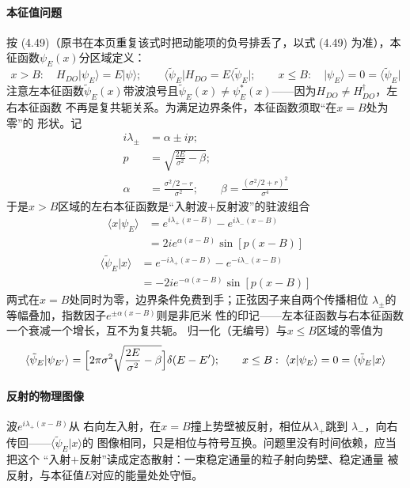 \paragraph{本征值问题}
按 (4.49)（原书在本页重复该式时把动能项的负号排丢了，以式 (4.49)
为准），本征函数$\psi_E(x)$分区域定义：
\begin{equation*}
x>B:\quad H_{DO}\vert\psi_E\rangle=E\vert\psi\rangle;\qquad
\langle\tilde{\psi}_E\vert H_{DO}=E\langle\tilde{\psi}_E\vert;
\qquad x\leq B:\quad \vert\psi_E\rangle=0=\langle\tilde{\psi}_E\vert
\end{equation*}
注意左本征函数$\tilde{\psi}_E(x)$带波浪号且$\tilde{\psi}_E(x)\neq
\psi_E^{*}(x)$——因为$H_{DO}\neq H_{DO}^{\dagger}$，左右本征函数
不再是复共轭关系。为满足边界条件，本征函数须取“在$x=B$处为零”的
形状。记
\begin{align*}
i\lambda_{\pm}&=\alpha\pm ip;\\
p&=\sqrt{\frac{2E}{\sigma^{2}}-\beta};\\
\alpha&=\frac{\sigma^{2}/2-r}{\sigma^{2}};\qquad
\beta=\frac{(\sigma^{2}/2+r)^{2}}{\sigma^{4}}
\end{align*}
于是$x>B$区域的左右本征函数是“入射波$+$反射波”的驻波组合
\begin{align*}
\langle x\vert\psi_E\rangle&=e^{i\lambda_{+}(x-B)}-e^{i\lambda_{-}(x-B)}\\
&=2ie^{\alpha(x-B)}\sin[p(x-B)]
\tag{4.61}
\end{align*}
\begin{align*}
\langle\tilde{\psi}_E\vert x\rangle&=e^{-i\lambda_{+}(x-B)}
-e^{-i\lambda_{-}(x-B)}\\
&=-2ie^{-\alpha(x-B)}\sin[p(x-B)]
\tag{4.62}
\end{align*}
两式在$x=B$处同时为零，边界条件免费到手；正弦因子来自两个传播相位
$\lambda_{\pm}$的等幅叠加，指数因子$e^{\pm\alpha(x-B)}$则是非厄米
性的印记——左本征函数与右本征函数一个衰减一个增长，互不为复共轭。
归一化（无编号）与$x\leq B$区域的零值为
\begin{equation*}
\langle\tilde{\psi}_E\vert\psi_{E'}\rangle=\Bigl[2\pi\sigma^{2}
\sqrt{\frac{2E}{\sigma^{2}}-\beta}\Bigr]\delta(E-E');\qquad
x\leq B:\ \langle x\vert\psi_E\rangle=0=\langle\tilde{\psi}_E\vert x\rangle
\end{equation*}

\paragraph{反射的物理图像}
波$e^{i\lambda_{+}(x-B)}$从
右向左入射，在$x=B$撞上势壁被反射，相位从$\lambda_{+}$跳到
$\lambda_{-}$，向右传回——$\langle\tilde{\psi}_E\vert x\rangle$的
图像相同，只是相位与符号互换。问题里没有时间依赖，应当把这个
“入射$+$反射”读成定态散射：一束稳定通量的粒子射向势壁、稳定通量
被反射，与本征值$E$对应的能量处处守恒。

